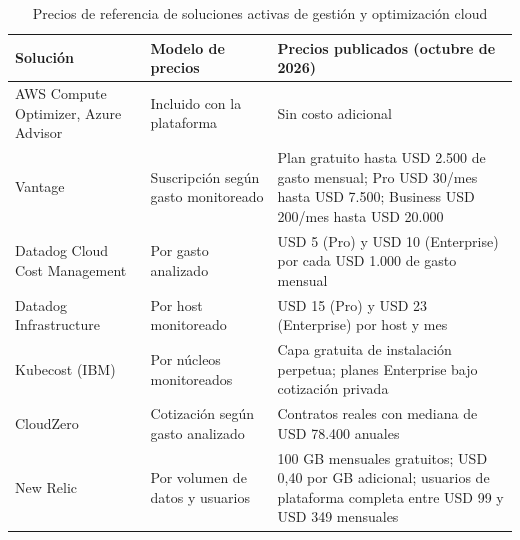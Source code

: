 \begin{table}[H]
\centering
\scriptsize
\setlength{\tabcolsep}{4pt}
\renewcommand{\arraystretch}{1.2}
\begin{tabular}{|p{3.6cm}|p{3.0cm}|p{6.8cm}|}
\hline
\textbf{Solución} & \textbf{Modelo de precios} & \textbf{Precios publicados (octubre de 2026)} \\
\hline
AWS Compute Optimizer, Azure Advisor & Incluido con la plataforma & Sin costo adicional \parencite{AWSComputeOptimizer2026, AzureAdvisor2026} \\
\hline
Vantage & Suscripción según gasto monitoreado & Plan gratuito hasta USD 2.500 de gasto mensual; Pro USD 30/mes hasta USD 7.500; Business USD 200/mes hasta USD 20.000 \parencite{Vantage2026} \\
\hline
Datadog Cloud Cost Management & Por gasto analizado & USD 5 (Pro) y USD 10 (Enterprise) por cada USD 1.000 de gasto mensual \parencite{DatadogPricing2026} \\
\hline
Datadog Infrastructure & Por host monitoreado & USD 15 (Pro) y USD 23 (Enterprise) por host y mes \parencite{DatadogPricing2026} \\
\hline
Kubecost (IBM) & Por núcleos monitoreados & Capa gratuita de instalación perpetua; planes Enterprise bajo cotización privada \parencite{Kubecost2026} \\
\hline
CloudZero & Cotización según gasto analizado & Contratos reales con mediana de USD 78.400 anuales \parencite{VendrCloudZero2026} \\
\hline
New Relic & Por volumen de datos y usuarios & 100 GB mensuales gratuitos; USD 0,40 por GB adicional; usuarios de plataforma completa entre USD 99 y USD 349 mensuales \parencite{NewRelic2026} \\
\hline
\end{tabular}
\caption{Precios de referencia de soluciones activas de gestión y optimización cloud}
\label{tab:precios-mercado}
\end{table}


